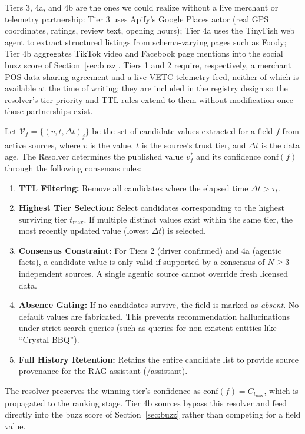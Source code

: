 \documentclass[acmsmall,screen]{acmart}
\begin{document}
Tiers 3, 4a, and 4b are the ones we could realize without a live merchant or telemetry partnership: Tier 3 uses Apify's Google Places actor (real GPS coordinates, ratings, review text, opening hours); Tier 4a uses the TinyFish web agent to extract structured listings from schema-varying pages such as Foody; Tier 4b aggregates TikTok video and Facebook page mentions into the social buzz score of Section~\ref{sec:buzz}. Tiers 1 and 2 require, respectively, a merchant POS data-sharing agreement and a live VETC telemetry feed, neither of which is available at the time of writing; they are included in the registry design so the resolver's tier-priority and TTL rules extend to them without modification once those partnerships exist.

Let $\mathcal{V}_f = \{(v, t, \Delta t)_j\}$ be the set of candidate values extracted for a field $f$ from active sources, where $v$ is the value, $t$ is the source's trust tier, and $\Delta t$ is the data age. The Resolver determines the published value $v_f^*$ and its confidence $\text{conf}(f)$ through the following consensus rules:
\begin{enumerate}
    \item \textbf{TTL Filtering:} Remove all candidates where the elapsed time $\Delta t > \tau_t$.
    \item \textbf{Highest Tier Selection:} Select candidates corresponding to the highest surviving tier $t_{\text{max}}$. If multiple distinct values exist within the same tier, the most recently updated value (lowest $\Delta t$) is selected.
    \item \textbf{Consensus Constraint:} For Tiers 2 (driver confirmed) and 4a (agentic facts), a candidate value is only valid if supported by a consensus of $N \geq 3$ independent sources. A single agentic source cannot override fresh licensed data.
    \item \textbf{Absence Gating:} If no candidates survive, the field is marked as \textit{absent}. No default values are fabricated. This prevents recommendation hallucinations under strict search queries (such as queries for non-existent entities like ``Crystal BBQ'').
    \item \textbf{Full History Retention:} Retains the entire candidate list to provide source provenance for the RAG assistant ($\slash$assistant).
\end{enumerate}
The resolver preserves the winning tier's confidence as $\text{conf}(f) = C_{t_{\text{max}}}$, which is propagated to the ranking stage. Tier 4b sources bypass this resolver and feed directly into the buzz score of Section~\ref{sec:buzz} rather than competing for a field value.
\end{document}
